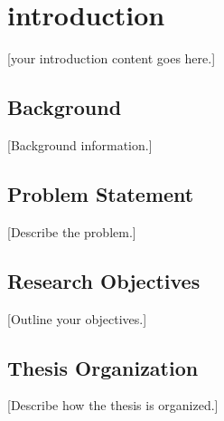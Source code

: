 \chapter{introduction}

[your introduction content goes here.]

\section{Background}

[Background information.]

\section{Problem Statement}

[Describe the problem.]

\section{Research Objectives}

[Outline your objectives.]

\section{Thesis Organization}

[Describe how the thesis is organized.]

